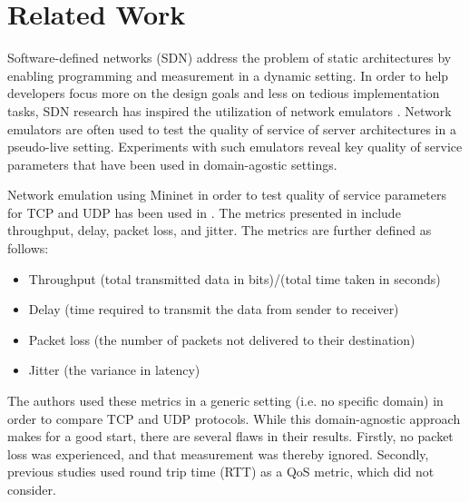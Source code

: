 \documentclass{article}
\begin{document}


\section{Related Work}
Software-defined networks (SDN) address the problem of static architectures by enabling programming and measurement in a dynamic setting. In order to help developers 
focus more on the design goals and less on tedious implementation tasks, SDN research has inspired the utilization of network emulators \cite{mininet_emulation_2014}. 
Network emulators are often used to test the quality of service of server architectures in a pseudo-live setting. Experiments with such emulators reveal key quality of 
service parameters that have been used in domain-agostic settings. 

Network emulation using Mininet in order to test quality of service parameters for TCP and UDP has been used in \cite{qos_analysis_2022, chauhan_atulkar_2020}. The 
metrics presented in \cite{qos_analysis_2022} include throughput, delay, packet loss, and jitter. The metrics are further defined as follows: 
\begin{itemize}
    \item Throughput (total transmitted data in bits)/(total time taken in seconds)
    \item Delay (time required to transmit the data from sender to receiver)
    \item Packet loss (the number of packets not delivered to their destination)
    \item Jitter (the variance in latency)
\end{itemize}
The authors used these metrics in a generic setting (i.e. no specific domain) in order to compare TCP and UDP protocols. While this domain-agnostic approach makes for 
a good start, there are several flaws in their results. Firstly, no packet loss was experienced, and that measurement was thereby ignored. Secondly, previous studies 
\cite{shamim2018performance, chauhan2020achieving, althobyani2018implementing} used round trip time (RTT) as a QoS metric, which \cite{qos_analysis_2022} did not consider. 
\end{document}
